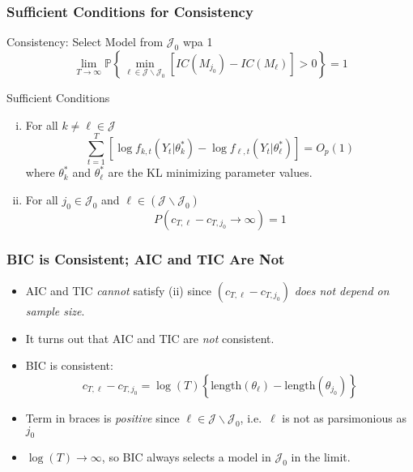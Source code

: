 %  
\begin{frame}
  \frametitle{Sufficient Conditions for Consistency}

  \begin{block}{Consistency: Select Model from $\mathcal{J}_0$ wpa 1}
    $$\lim_{T\rightarrow \infty}\mathbb{P}\left\{ \underset{\ell \in \mathcal{J}\backslash \mathcal{J}_0}{\min} \left[ IC(M_{j_0}) - IC(M_\ell)\right] > 0 \right\} = 1$$
  \end{block}

  \pause
 
  \begin{block}{Sufficient Conditions}
			\begin{enumerate}[(i)]
				\item For all $k \neq \ell \in \mathcal{J}$ 
					$$\sum_{t=1}^T \left[\log f_{k,t}(Y_t|\theta^*_k) - \log f_{\ell,t}(Y_t|\theta^*_\ell) \right] = O_p(1)$$
				where $\theta^*_k$ and $\theta^*_\ell$ are the KL minimizing parameter values.
				\item For all $j_0 \in \mathcal{J}_0$ and $\ell \in (\mathcal J \backslash \mathcal{J}_0)$
					$$P\left(c_{T,\ell} - c_{T,j_0} \rightarrow \infty \right) = 1$$
			\end{enumerate}
\end{block}
  
\end{frame}
\begin{frame}
  \frametitle{BIC is Consistent; AIC and TIC Are Not}

  \begin{itemize}
    \item AIC and TIC \emph{cannot} satisfy (ii) since $(c_{T,\ell} - c_{T,j_0})$ \emph{does not depend on sample size}. \pause
    \item  It turns out that AIC and TIC are \emph{not} consistent. \pause
    \item BIC is consistent:
	$$c_{T,\ell} - c_{T,j_0} = \log(T) \left\{\mbox{length}(\theta_\ell) - \mbox{length}(\theta_{j_0}) \right\}$$
  \item Term in braces is \emph{positive} since $\ell \in\mathcal{J}\backslash \mathcal{J}_0$, i.e.\ $\ell$ is not as parsimonious as $j_0$
  \item $\log(T) \rightarrow \infty$, so BIC always selects a model in $\mathcal{J}_0$ in the limit.
  \end{itemize}

\end{frame}
